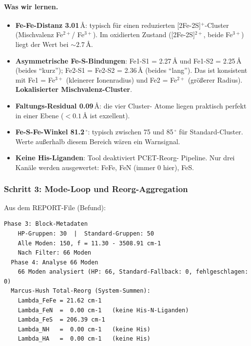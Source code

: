 \documentclass[11pt,a4paper,twoside]{article}
\providecommand{\angstrom}{\text{\AA}}    %
\theoremstyle{remark}
\begin{document}
\paragraph{Was wir lernen.}
\begin{itemize}\setlength{\itemsep}{0pt}
  \item \textbf{Fe-Fe-Distanz 3.01\,$\angstrom$}: typisch f\"ur einen
        reduzierten [2Fe-2S]$^{+}$-Cluster (Mischvalenz Fe$^{2+}$/
        Fe$^{3+}$). Im oxidierten Zustand
        ([2Fe-2S]$^{2+}$, beide Fe$^{3+}$) liegt der Wert bei
        $\sim 2.7$\,$\angstrom$.
  \item \textbf{Asymmetrische Fe-S-Bindungen}: Fe1-S1 = 2.27\,$\angstrom$
        und Fe1-S2 = 2.25\,$\angstrom$ (beides "`kurz"'); Fe2-S1 =
        Fe2-S2 = 2.36\,$\angstrom$ (beides "`lang"'). Das ist
        konsistent mit Fe1 = Fe$^{3+}$ (kleinerer Ionenradius) und
        Fe2 = Fe$^{2+}$ (gr\"o{\ss}erer Radius). \textbf{Lokalisierter
        Mischvalenz-Cluster}.
  \item \textbf{Faltungs-Residual 0.09\,$\angstrom$}: die vier Cluster-
        Atome liegen praktisch perfekt in einer Ebene
        ($< 0.1\,\angstrom$ ist exzellent).
  \item \textbf{Fe-S-Fe-Winkel 81.2\,$^{\circ}$}: typisch zwischen 75
        und 85\,$^{\circ}$ f\"ur Standard-Cluster. Werte au{\ss}erhalb
        diesem Bereich w\"aren ein Warnsignal.
  \item \textbf{Keine His-Liganden}: Tool deaktiviert PCET-Reorg-
        Pipeline. Nur drei Kan\"ale werden ausgewertet: FeFe, FeN
        (immer 0 hier), FeS.
\end{itemize}

\subsubsection*{Schritt 3: Mode-Loop und Reorg-Aggregation}

Aus dem REPORT-File (Befund):
\begin{lstlisting}[basicstyle=\ttfamily\small]
  Phase 3: Block-Metadaten
    HP-Gruppen: 30  |  Standard-Gruppen: 50
    Alle Moden: 150, f = 11.30 - 3508.91 cm-1
    Nach Filter: 66 Moden
  Phase 4: Analyse 66 Moden
    66 Moden analysiert (HP: 66, Standard-Fallback: 0, fehlgeschlagen: 0)
  Marcus-Hush Total-Reorg (System-Summen):
    Lambda_FeFe = 21.62 cm-1
    Lambda_FeN  =  0.00 cm-1   (keine His-N-Liganden)
    Lambda_FeS  = 206.39 cm-1
    Lambda_NH   =  0.00 cm-1   (keine His)
    Lambda_HA   =  0.00 cm-1   (keine His)
\end{lstlisting}
\end{document}
